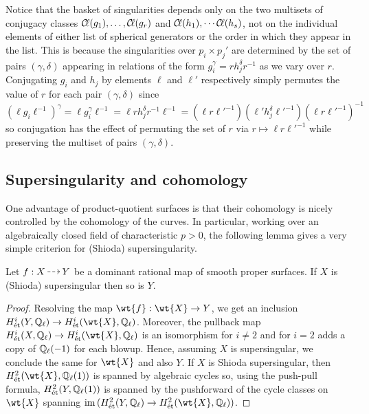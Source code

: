 \documentclass[main.tex]{subfiles}
\begin{document}
\begin{rmk} \label{rmk:baseket_depends_only_conjugacy_multiset}
Notice that the basket of singularities depends only on the two multisets of conjugacy classes $\operatorname{\mathcal{C}\!{\ell}}(g_1), \dots, \operatorname{\mathcal{C}\!{\ell}}(g_r)$ and $\operatorname{\mathcal{C}\!{\ell}}(h_1), \cdots \operatorname{\mathcal{C}\!{\ell}}(h_s)$, not on the individual elements of either list of spherical generators or the order in which they appear in the list. This is because the singularities over $p_i \times p_j'$ are determined by the set of pairs $(\gamma, \delta)$ appearing in relations of the form $g_i^{\gamma} = r h_j^{\delta} r^{-1}$ as we vary over $r$. Conjugating $g_i$ and $h_j$ by elements $\ell$ and $\ell'$ respectively simply permutes the value of $r$ for each pair $(\gamma, \delta)$ since 
\[ (\ell g_i \ell^{-1})^{\gamma} = \ell g_i^{\gamma} \ell^{-1} = \ell r h_j^{\delta} r^{-1} \ell^{-1} = (\ell r \ell'^{-1}) (\ell' h_j^{\delta} \ell'^{-1}) (\ell r \ell'^{-1})^{-1} \]
so conjugation has the effect of permuting the set of $r$ via $r \mapsto \ell r \ell'^{-1}$ while preserving the multiset of pairs $(\gamma, \delta)$. 
\end{rmk}

\subsection{Supersingularity and \etale cohomology}

One advantage of product-quotient surfaces is that their cohomology is nicely controlled by the cohomology of the curves. In particular, working over an algebraically closed field of characteristic $p > 0$, the following lemma gives a very simple criterion for (Shioda) supersingularity.

\begin{lemma} \label{lem:supersingular_domination}
Let $f : X \rat Y$ be a dominant rational map of smooth proper surfaces. If $X$ is (Shioda) supersingular then so is $Y$.
\end{lemma}

\begin{proof}
Resolving the map $\wt{f} : \wt{X} \to Y$, we get an inclusion $H^i_{\et}(Y, \Q_{\ell}) \to H^i_{\et}(\wt{X}, \Q_{\ell})$. Moreover, the pullback map $H^i_{\et}(X, \Q_{\ell}) \to H^i_{\et}(\wt{X}, \Q_{\ell})$ is an isomorphism for $i \neq 2$ and for $i = 2$ adds a copy of $\mathbb{Q}_{\ell}(-1)$ for each blowup. Hence, assuming $X$ is supersingular, we conclude the same for $\wt{X}$ and also $Y$. If $X$ is Shioda supersingular, then $H^2_{\et}(\wt{X}, \Q_{\ell}(1))$ is spanned by algebraic cycles so, using the push-pull formula, $H^2_{\mathrm{\acute{e}t}}(Y, \mathbb{Q}_{\ell}(1))$ is spanned by the pushforward of the cycle classes on $\wt{X}$ spanning $\im{(H^2_{\et}(Y, \Q_{\ell}) \to H^2_{\et}(\wt{X}, \Q_{\ell}))}$.
\end{proof}
\end{document}

